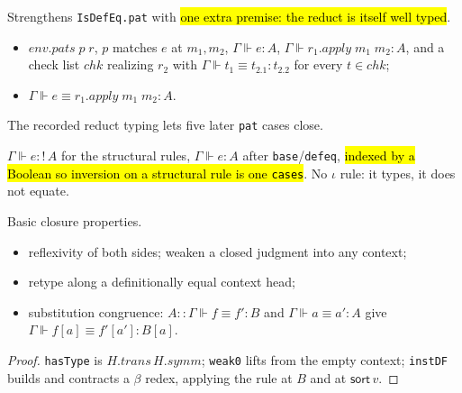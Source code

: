 \begin{definition}
\label{inductive:isdefeqstrong-pat}
\leanok
{}

 Strengthens \texttt{IsDefEq.pat} with \hl{one extra premise: the reduct is
itself well typed}.
\begin{itemize}
\item {} $env.pats\;p\;r$, $p$ matches $e$ at $m_1, m_2$, $\Gamma \Vdash e : A$,
      $\Gamma \Vdash r_1.apply\;m_1\;m_2 : A$, and a check list $chk$ realizing $r_2$ with
      $\Gamma \Vdash t_1 \equiv t_{2.1} : t_{2.2}$ for every $t \in chk$;
\item {} $\Gamma \Vdash e \equiv r_1.apply\;m_1\;m_2 : A$.
\end{itemize}
The recorded reduct typing lets five later \texttt{pat} cases close.
\end{definition}

\begin{definition}
\label{def:hastypestrong}
\leanok
{}

 $\Gamma \Vdash e :!\,A$ for the structural rules, $\Gamma \Vdash e : A$ after
\texttt{base}/\texttt{defeq}, \hl{indexed by a Boolean so inversion on a structural rule is one
\texttt{cases}}. No $\iota$ rule: it types, it does not equate.
\end{definition}

\begin{lemma}
\label{fam:strong-basic}
\leanok
{}

 Basic closure properties.
\begin{itemize}
\item reflexivity of both sides; weaken a closed judgment into any context;
\item retype along a definitionally equal context head;
\item substitution congruence: $A::\Gamma \Vdash f\equiv f':B$ and $\Gamma\Vdash a\equiv a':A$
      give $\Gamma\Vdash f[a]\equiv f'[a']:B[a]$.
\end{itemize}
\end{lemma}
\begin{proof}
\leanok
{} \texttt{hasType} is $H.trans\,H.symm$; \texttt{weak0} lifts from the empty context;
\texttt{instDF} builds and contracts a $\beta$ redex, applying the rule at $B$ and at
$\mathsf{sort}\,v$.
\end{proof}

